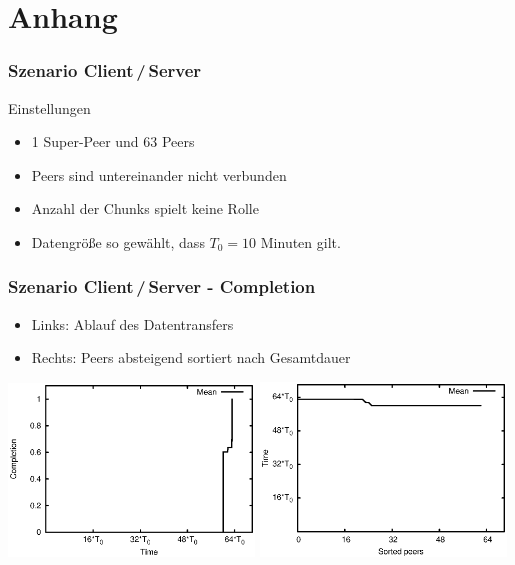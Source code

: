 
\section{Anhang}




\begin{frame}
  \frametitle{Szenario Client\,/\,Server}
  \begin{block}{Einstellungen}
    \begin{itemize}  
      \item 1 Super-Peer und 63 Peers
      \vspace{2mm}
      \item Peers sind untereinander nicht verbunden
      \vspace{2mm}
      \item Anzahl der Chunks spielt keine Rolle
      \vspace{2mm}
      \item Datengröße so gewählt, dass $T_0=10$ Minuten gilt.
    \end{itemize}   
  \end{block}
\end{frame}

\begin{frame}
  \frametitle{Szenario Client\,/\,Server - Completion}
  \begin{itemize}  
    \item Links: Ablauf des Datentransfers
    \item Rechts: Peers absteigend sortiert nach Gesamtdauer
  \end{itemize}

  \begin{center}
    \includegraphics[width=0.49\textwidth]{fig/plots/scenario_2_seq/plots/GeneratedMeanChunkCompletion.csv.eps}
    \hfill
    \includegraphics[width=0.49\textwidth]{fig/plots/scenario_2_seq/plots/GeneratedMeanSortedChunkCompletion.csv.eps}
  \end{center}
\end{frame}


